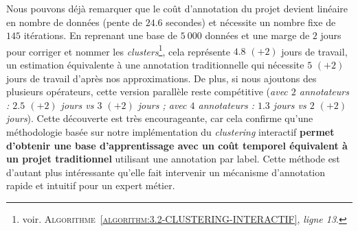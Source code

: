 			Nous pouvons déjà remarquer que le coût d'annotation du projet devient linéaire en nombre de données (pente de $24.6$ secondes) et nécessite un nombre fixe de $145$ itérations.
			En reprenant une base de $5~000$ données et une marge de $2$ jours pour corriger et nommer les \textit{clusters}\footnote{
				voir. \textsc{Algorithme~\ref{algorithm:3.2-CLUSTERING-INTERACTIF}}, \textit{ligne 13}.
			}, cela représente $4.8$ {\footnotesize $(+2)$} jours de travail, un estimation équivalente à une annotation traditionnelle qui nécessite $5 $ {\footnotesize $(+2)$} jours de travail d'après nos approximations.
			De plus, si nous ajoutons des plusieurs opérateurs, cette version parallèle reste compétitive (\textit{avec $2$ annotateurs : $2.5$ {\footnotesize $(+2)$} jours vs $3$ {\footnotesize $(+2)$} jours ; avec $4$ annotateurs : $1.3$ jours vs $2$ {\footnotesize $(+2)$} jours}).
			Cette découverte est très encourageante, car cela confirme qu'une méthodologie basée sur notre implémentation du \textit{clustering} interactif \textbf{permet d'obtenir une base d'apprentissage avec un coût temporel équivalent à un projet traditionnel} utilisant une annotation par label.
			Cette méthode est d'autant plus intéressante qu'elle fait intervenir un mécanisme d'annotation rapide et intuitif pour un expert métier.
			
